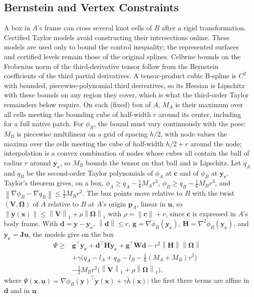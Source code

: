 \documentclass[journal]{IEEEtran}
\theoremstyle{definition}
\newcommand{\norm}[1]{\left\lVert #1\right\rVert}
\begin{document}
\subsection{Bernstein and Vertex Constraints}
A box in $A$'s frame can cross several knot cells of $B$ after a rigid transformation.
Certified Taylor models avoid constructing their intersections online. These models are used
only to bound the control inequality; the represented surfaces and certified levels remain
those of the original splines.
Cellwise bounds on the Frobenius norm of the third-derivative tensor follow from the Bernstein
coefficients of the third partial derivatives. A tensor-product cubic B-spline is $C^2$ with bounded,
piecewise-polynomial third
derivatives, so its Hessian is Lipschitz with these bounds on any region they cover, which is what the
third-order Taylor remainders below require. On each (fixed) box of $A$, $M_A$ is their maximum over
all cells meeting the bounding cube of half-width $r$ around its center, including for a full
native patch. For $\phi_B$, the bound must vary continuously with the pose:
$M_B$ is piecewise multilinear on a grid of spacing $h/2$, with node values the maxima over the cells meeting
the cube of half-width $h/2+r$ around the node; interpolation is a convex combination of nodes whose
cubes all contain the ball of radius $r$ around $\mathbf y_{\mathbf c}$, so $M_B$ bounds the tensor on
that ball and is Lipschitz. Let $q_A$ and $q_B$ be the second-order Taylor polynomials of
$\phi_A$ at $\mathbf c$ and of $\phi_B$ at $\mathbf y_{\mathbf c}$. Taylor's theorem gives, on a box,
$\phi_A\ge q_A-\tfrac16M_Ar^3$, $\phi_B\ge q_B-\tfrac16M_Br^3$, and
$\norm{\nabla\phi_B-\nabla q_B}\le\tfrac12M_Br^2$. The box points move relative to $B$ with the twist
$(\mathbf V,\boldsymbol\Omega)$ of $A$ relative to $B$ at $A$'s origin $\mathbf p_A$, linear in $\mathbf u$,
so $\norm{\dot{\mathbf y}(\mathbf x)}\le\norm{\mathbf V}_1+\rho\norm{\boldsymbol\Omega}_1$ with
$\rho=\norm{\mathbf c}+r$, since $\mathbf c$ is expressed in $A$'s body frame.
With $\mathbf d=\mathbf y-\mathbf y_{\mathbf c}$, $\norm{\mathbf d}\le r$,
$\mathbf g=\nabla\phi_B(\mathbf y_{\mathbf c})$, $\mathbf H=\nabla^2\phi_B(\mathbf y_{\mathbf c})$, and
$\dot{\mathbf y}_{\mathbf c}=\mathbf J\mathbf u$, the models give on the box
\begin{equation}\label{eq:psi-lb}
\begin{aligned}
\Psi\ge{}&\mathbf g^\top\dot{\mathbf y}_{\mathbf c}+\mathbf d^\top\mathbf H\dot{\mathbf y}_{\mathbf c}
+\mathbf g^\top\mathbf W\mathbf d-r^2\norm{\mathbf H}\norm{\boldsymbol\Omega}\\
&+\gamma\big(q_A-l_A+q_B-l_B-\tfrac16(M_A+M_B)r^3\big)\\
&-\tfrac12M_Br^2\big(\norm{\mathbf V}_1+\rho\norm{\boldsymbol\Omega}_1\big),
\end{aligned}
\end{equation}
where $\Psi(\mathbf x,\mathbf u)=\nabla\phi_B(\mathbf y)^\top\dot{\mathbf y}(\mathbf x)+\gamma\tilde h(\mathbf x)$;
the first three terms are affine in $\mathbf d$ and in $\mathbf u$.
\end{document}
